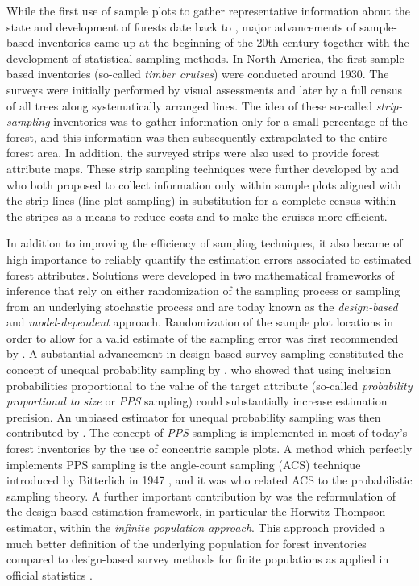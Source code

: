 While the first use of sample plots to gather representative information about the state and development of forests date back to \citet{hartig1795}, major advancements of sample-based inventories came up at the beginning of the 20th century together with the development of statistical sampling methods. In North America, the first sample-based inventories (so-called \textit{timber cruises}) were conducted around 1930. The surveys were initially performed by visual assessments and later by a full census of all trees along systematically arranged lines. The idea of these so-called \textit{strip-sampling} inventories was to gather information only for a small percentage of the forest, and this information was then subsequently extrapolated to the entire forest area. In addition, the surveyed strips were also used to provide forest attribute maps. These strip sampling techniques were further developed by \citet{goodspeed1934} and \citet{langballe1938} who both proposed to collect information only within sample plots aligned with the strip lines (line-plot sampling) in substitution for a complete census within the stripes as a means to reduce costs and to make the cruises more efficient.\par 

In addition to improving the efficiency of sampling techniques, it also became of high importance to reliably quantify the estimation errors associated to estimated forest attributes. Solutions were developed in two mathematical frameworks of inference that rely on either randomization of the sampling process or sampling from an underlying stochastic process and are today known as the \textit{design-based} and \textit{model-dependent} approach. Randomization of the sample plot locations in order to allow for a valid estimate of the sampling error was first recommended by \citet{hasel1938}. A substantial advancement in design-based survey sampling constituted the concept of unequal probability sampling by \citet{hansen1943}, who showed that using inclusion probabilities proportional to the value of the target attribute (so-called \textit{probability proportional to size} or \textit{PPS} sampling) could substantially increase estimation precision. An unbiased estimator for unequal probability sampling was then contributed by \citet{horvitz1952}. The concept of \textit{PPS} sampling is implemented in most of today's forest inventories by the use of concentric sample plots. A method which perfectly implements PPS sampling is the angle-count sampling (ACS) technique introduced by Bitterlich in 1947 \citep{bitterlich1984}, and it was \citet{grosenbaugh1958} who related ACS to the probabilistic sampling theory. A further important contribution by \citet{mandallaz1991} was the reformulation of the design-based estimation framework, in particular the Horwitz-Thompson estimator, within the \textit{infinite population approach}. This approach provided a much better definition of the underlying population for forest inventories compared to design-based survey methods for finite populations as applied in official statistics \citep[e.g.,][]{sarndal2003}.\par

